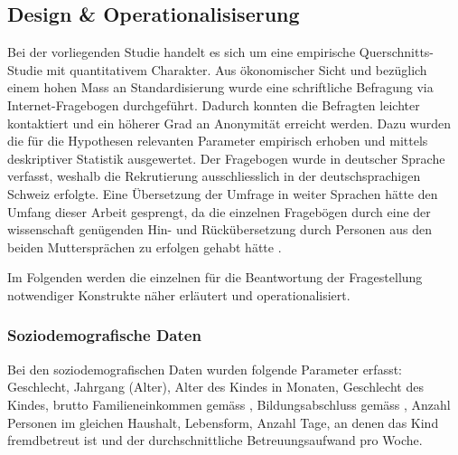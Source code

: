 \subsection{Design \& Operationalisiserung} \label{sec:Design}
Bei der vorliegenden Studie handelt es sich um eine empirische Querschnitts-Studie mit quantitativem Charakter. Aus ökonomischer Sicht und bezüglich einem hohen Mass an Standardisierung \cite[S.~86ff]{sedlmeier2008} wurde eine schriftliche Befragung via Internet-Fragebogen durchgeführt. Dadurch konnten die Befragten leichter kontaktiert und ein höherer Grad an Anonymität erreicht werden. Dazu wurden die für die Hypothesen relevanten Parameter empirisch erhoben und mittels deskriptiver Statistik ausgewertet. Der Fragebogen wurde in deutscher Sprache verfasst, weshalb die Rekrutierung ausschliesslich in der deutschsprachigen Schweiz erfolgte. Eine Übersetzung der Umfrage in weiter Sprachen hätte den Umfang dieser Arbeit gesprengt, da die einzelnen Fragebögen durch eine der wissenschaft genügenden Hin- und Rückübersetzung durch Personen aus den beiden Muttersprächen zu erfolgen gehabt hätte \cite{Pfetsch2016}.

Im Folgenden werden die einzelnen für die Beantwortung der Fragestellung notwendiger Konstrukte näher erläutert und operationalisiert.

\subsubsection{Soziodemografische Daten}\label{sec:SoziodemografischeDaten}
Bei den soziodemografischen Daten wurden folgende Parameter erfasst: Geschlecht, Jahrgang (Alter), Alter des Kindes in Monaten, Geschlecht des Kindes, brutto Familieneinkommen gemäss , Bildungsabschluss gemäss , Anzahl Personen im gleichen Haushalt, Lebensform, Anzahl Tage, an denen das Kind fremdbetreut ist und der durchschnittliche Betreuungsaufwand pro Woche.


